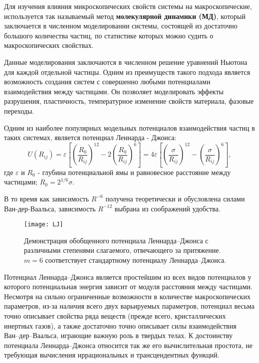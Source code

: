 Для изучения влияния микроскопических свойств системы на макроскопические, используется так называемый метод \textbf{молекулярной динамики (МД)}, который заключается в численном моделировании системы, состоящей из достаточно большого количества частиц, по статистике которых можно судить о макроскопических свойствах. 

Данные моделирования заключаются в численном решение уравнений Ньютона для каждой отдельной частицы. Одним из преимуществ такого подхода является возможность создания систем с совершенно любыми потенциалами взаимодействия между частицами. Он позволяет моделировать эффекты разрушения, пластичность, температурное изменение свойств материала, фазовые переходы.

Одним из наиболее популярных модельных потенциалов взаимодействия частиц в таких системах, является потенциал Леннарда - Джонса:
\begin{equation}
U\left(R_{i j}\right)=\varepsilon\left[\left(\frac{R_{0}}{R_{i j}}\right)^{12}-2\left(\frac{R_{0}}{R_{i j}}\right)^{6}\right]=4 \varepsilon\left[\left(\frac{\sigma}{R_{i j}}\right)^{12}-\left(\frac{\sigma}{R_{i j}}\right)^{6}\right], 
\label{eqFullLJ}
\end{equation}
где $\varepsilon$ и $R_0$ - глубина потенциальной ямы и равновесное расстояние между частицами; $R_0 = 2^{1/6}\sigma$.

В то время как зависимость $R^{-6}$ получена теоретически и обусловлена силами Ван-дер-Ваальса, зависимость $R^{-12}$ выбрана из соображений удобства.

\begin{figure}[h]
\begin{center}
\texttt{[image: LJ]}
\caption{Демонстрация обобщенного потенциала Леннарда--Джонса с различными степенями слагаемого, отвечающего за притяжение. $m = 6$ соответствует стандартному потенциалу Леннарда--Джонса.}
\label{risLJvar}
\end{center}
\end{figure}

Потенциал Леннарда--Джонса является простейшим из всех видов потенциалов у которого потенциальная энергия зависит от модуля расстояния между частицами. Несмотря на сильно ограниченные возможности в количестве макроскопических параметров, из-за наличия всего двух варьируемых параметров, потенциал весьма точно описывает свойства ряда веществ (прежде всего, кристаллических инертных газов), а также достаточно точно описывает силы взаимодействия \\ Ван--дер--Ваальса, играющие важную роль в твердых телах. К достоинству потенциала Леннарда--Джонса относится так же его вычислительная простота, не требующая вычисления иррациональных и трансцендентных функций.

